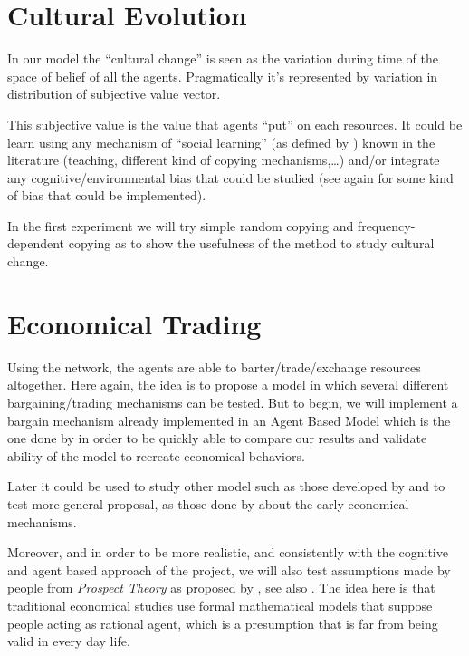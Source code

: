 \documentclass[a4paper]{article}
\begin{document}
\section{Cultural Evolution}
In our model the ``cultural change'' is seen as the variation during time of the space of belief of all the agents. Pragmatically it's represented by variation in distribution of subjective value vector.

This subjective value is the value that agents ``put'' on each resources. It could be learn using any mechanism of ``social learning'' (as defined by \cite{lycett2015}) known in the literature (teaching, different kind of copying mechanisms,\ldots) and/or integrate any cognitive/environmental bias that could be studied (see again \cite{lycett2015} for some kind of bias that could be implemented).

In the first experiment we will try simple random copying and frequency-dependent copying as \cite{mesoudi2009randomcopyingfrequencydependencopyingandulturechange} to show the usefulness of the method to study cultural change. 


\section{Economical Trading}
\label{trade}

Using the network, the agents are able to barter/trade/exchange resources altogether. Here again, the idea is to propose a model in which several different bargaining/trading mechanisms can be tested. But to begin, we will implement a bargain mechanism already implemented in an Agent Based Model which is the one done by \cite{gintis2006theemergenceofapricesystemfromdecentralizedbilateralexchange} in order to be quickly able to compare our results and validate ability of the model to recreate economical behaviors. 

Later it could be used to study other model such as those developed by \cite{rubinstein1985equilibriuminamarketwithsequentialbargaining} and to test more general proposal, as those done by \cite{polanyi1957tradeandmarketintheearlyempireseconomiesinhistoryandtheory,polanyi1977thelivelihoodofman} about the early economical mechanisms.

Moreover, and in order to be more realistic, and consistently with the cognitive and agent based approach of the project, we will also test assumptions made by people from \emph{Prospect Theory} as proposed by \cite{kahneman1979prospecttheoryananalysisofdecisionunderrisk}, see also \cite{camerer2004prospecttheoryinthewildevidencefromthefield}. The idea here is that traditional economical studies use formal mathematical models that suppose people acting as rational agent, which is a presumption that is far from being valid  in every day life. 
\end{document}
